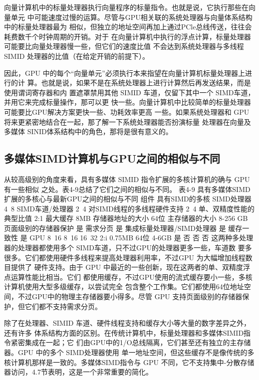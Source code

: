 向量计算机中的标量处理器执行向量程序的标量指令。也就是说，它执行那些在向量单元
中可能速度过慢的运算。尽管与GPU相关联的系统处理器与向量体系结构中的标量处理器最为
相似，但独立的地址空间再加上通过PCle总线传送，往往会耗费数千个时钟周期的开销。对于
在向量计算机中执行的浮点计算，标量处理器可能要比向量处理器慢一些，但它们的速度比值
不会达到系统处理器与多线程SIMID 处理器的比值（在给定开销的前提下）。

因此，GPU 中的每个“向量单元”必须执行本来指望在向量计算机标量处理器上进行的计
算。也就是说，如果不是在系统处理器上进行计算然后再发送结果，而是使用谓词寄存器和内
置遮罩禁用其他 SIMID 车道，仅留下其中一个 SIMD车道，并用它来完成标量操作，那可以更
快一些。向量计算机中比较简单的标量处理器可能要比GPU解决方案更快一些、功耗效率更高
一些。如果系统处理器和 GPU将来更紧密地结合在一起，那了解一下系统处理器能否扮演标量
处理器在向量及多媒体 SINID体系结构中的角色，那将是很有意义的。

\subsection{多媒体SIMD计算机与GPU之间的相似与不同}
从较高级别的角度来看，具有多媒体 SIMID 指令扩展的多核计算机的确与 GPU有一些相似
之处。表4-9总结了它们之间的相似与不同。
表4-9 具有多媒体SIMD扩展的多核心与最新GPU之间的相似与不同
组件
具有SIMD的多核
SIMD处理器
4~8
SIMD车道/处理器
2~4
对SIMD线程的多线程硬件支持
2~4
单、双精度性能的典型比值
2:1
最大缓存
8MB
存储器地址的大小
64位
主存储器的大小
8-256 GB
页面级别的存储器保护
是
需求分页
是
集成标量处理器/SIMD处理器
是
缓存一致性
是
GPU
8~16
8~16
16~32
2:i
0.75MB
64位
4-6GB
是
否
否
否
这两种多处理器的处理器都使用多个 SIMD车道，只不过GPU的处理器更多一些，车道数
要多很多。它们都使用硬件多线程来提高处理器利用率，不过GPU 为大幅增加线程数目提供了
硬件支持。由于 GPU 中最近的一些创新，现在这两者的单、双精度浮点运算性能比相当。它们
都使用缓存，不过GPU使用的流式缓存要小一些，多核计算机使用大型多级缓存，以尝试完全
包含整个工作集。它们都使用64位地址空间，不过GPU中的物理主存储器要小得多。尽管 GPU
支持页面级别的存储器保护，但它们都不支持需求分页。

除了在处理器、SIMID 车道、硬件线程支持和缓存大小等大量的数字差异之外，还有许多
体系结构方面的区别。在传统计算机中，标量处理器和多媒体SIMID指令紧密集成在一起；它
们由GPU中的1/O总线隔离，它们甚至还有独立的主存储器。GPU 中的多个 SIMD处理器使用
单一地址空间，但这些缓存不是像传统的多核计算机那样是一致的。多媒体SIMD指令与 GPU
不同，它不支持集中-分散存储器访问，4.7节表明，这是一个非常重要的简化。

